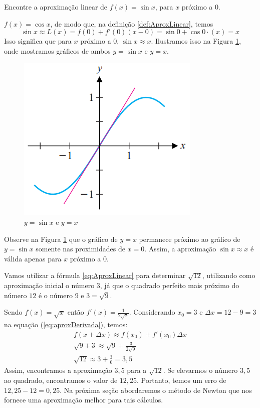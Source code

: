 \cleardoublepage\documentclass[../main.tex]{subfiles}
\begin{document}
\begin{ex}\label{ex:AproxSINX}
Encontre a aproximação linear de $f (x) = \sin x$, para $x$ próximo a $0$.\\
\begin{sol}
$f(x) =\cos x$, de modo que, na definição \ref{def:AproxLinear}, temos
$$\sin x \approx L (x) = f (0) + f'(0) (x - 0) = \sin 0 + \cos 0\cdot  (x) = x$$
Isso significa que para $x$ próximo a $0$, $\sin x \approx x$. Ilustramos isso na Figura \ref{fig:y=sinx-y}, onde mostramos
gráficos de ambos $y = \sin x$ e $y = x$.
\begin{figure}[H]
    \centering
    \includegraphics{fig_AproxLinear/sinxy=x.png}
    \caption{$y=\sin x$ e $y=x$}
    \label{fig:y=sinx-y}
\end{figure}

Observe na Figura \ref{fig:y=sinx-y} que o gráfico de $y = x$ permanece próximo ao gráfico de $y = \sin x$ somente nas proximidades de $x = 0$. Assim, a aproximação $\sin x \approx x $ é válida apenas para $x$ próximo a $0$.    
\end{sol}
\end{ex}
\begin{ex}\label{ex:AproxRaiz}
Vamos utilizar a fórmula \ref{eq:AproxLinear} para determinar $\sqrt{12}$, utilizando como aproximação inicial o número $3$, já que o quadrado perfeito mais próximo do número $12$ é o número $9$ e $3=\sqrt{9}$.
\begin{sol}
Sendo $f(x)=\sqrt{x}$ então $f'(x)=\frac{1}{2\sqrt{x}}$. Considerando $x_0=3$ e $\Delta x=12-9=3$ na equação (\ref{eq:aproxDerivada}), temos:
\begin{align*}
    f(x+\Delta x)\approx f(x_0)+f'(x_0)\Delta x\\
    \sqrt{9+3}\approx\sqrt{9}+\frac{3}{2\sqrt{9}}\\
    \sqrt{12}\approx3+\frac{3}{6}=3,5
    \end{align*}
Assim, encontramos a aproximação $3,5$ para a $\sqrt{12}$. Se elevarmos o número $3,5$ ao quadrado, encontramos o valor de $12,25$. Portanto, temos um erro de $12,25-12=0,25$. Na próxima seção abordaremos o método de Newton que nos fornece uma aproximação melhor para tais cálculos.
\end{sol}
\end{ex}
\end{document}
